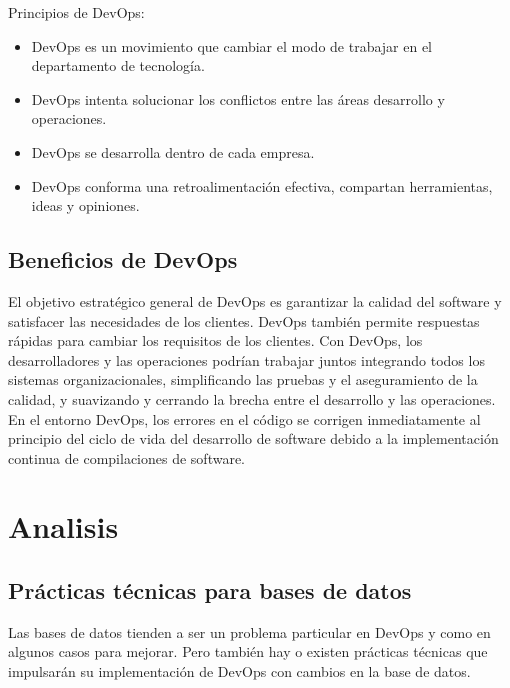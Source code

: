 \documentclass[twoside,twocolumn]{article}
\begin{document}
Principios de DevOps:

\begin{itemize}
\item DevOps es un movimiento que cambiar el modo de trabajar en el departamento de tecnología.
\item DevOps intenta solucionar los conflictos entre las áreas desarrollo y operaciones.
\item DevOps se desarrolla dentro de cada empresa.
\item DevOps conforma una retroalimentación efectiva, compartan herramientas, ideas y opiniones.

\end{itemize}


\subsection{Beneficios de DevOps}

El objetivo estratégico general de DevOps es garantizar la calidad del software y satisfacer las necesidades de los clientes. DevOps también permite respuestas rápidas para cambiar los requisitos de los clientes. Con DevOps, los desarrolladores y las operaciones podrían trabajar juntos integrando todos los sistemas organizacionales, simplificando las pruebas y el aseguramiento de la calidad, y suavizando y cerrando la brecha entre el desarrollo y las operaciones. En el entorno DevOps, los errores en el código se corrigen inmediatamente al principio del ciclo de vida del desarrollo de software debido a la implementación continua de compilaciones de software.




\section{Analisis}

\subsection{Prácticas técnicas para bases de datos}
Las bases de datos tienden a ser un problema particular en DevOps y como en algunos casos para mejorar.
Pero también hay o existen prácticas técnicas que impulsarán su implementación de DevOps con cambios en la base de datos.
\end{document}
